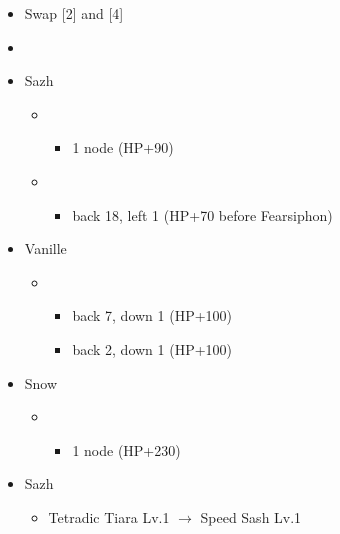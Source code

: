 \begin{menu}
	\begin{itemize}
	\paradigm
		\begin{itemize}
			\item Swap [2] and [4]
			\item {}%
				{\paradigmline{\com}{(\med)}{(\sen)}}%
				{\paradigmline{(\com)}{\sab}{(\sen)}}%
				{\paradigmline{\sen}{\med}{\sen}}%
				{\paradigmline[4]{\sen}{(\sen)}{\sen}}%
				{\paradigmline{\rav}{\med}{\sen}}%
				{\paradigmline{(\com)}{\rav}{(\sen)}}%
		\end{itemize}
	\crystarium
		\begin{itemize}
			\item Sazh
				\begin{itemize}
					\item \com
						\begin{itemize}
							\item 1 node (HP+90)
						\end{itemize}
					\item \rav
						\begin{itemize}
							\item back 18, left 1 (HP+70 before Fearsiphon)
						\end{itemize}
				\end{itemize}
			\item Vanille
				\begin{itemize}
					\item \rav
						\begin{itemize}
							\item back 7, down 1 (HP+100)
							\item back 2, down 1 (HP+100)
						\end{itemize}
				\end{itemize}
			\item Snow
				\begin{itemize}
					\item \com
						\begin{itemize}
							\item 1 node (HP+230)
						\end{itemize}
				\end{itemize}
		\end{itemize}
	\equip
		\begin{itemize}
			\item Sazh
				\begin{itemize}
					\item Tetradic Tiara Lv.1 $\rightarrow$ Speed Sash Lv.1

\end{itemize}
\end{itemize}
\end{itemize}
\end{menu}
